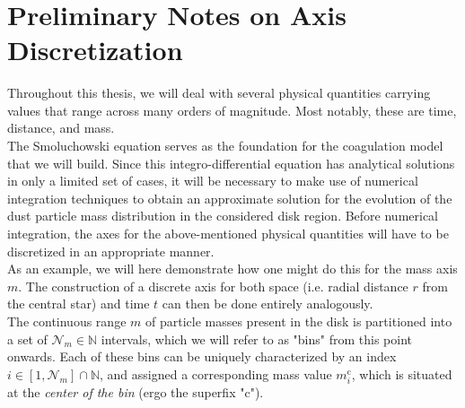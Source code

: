      \\
     \\
     \\
     \\
     \\


\clearpage\section{Preliminary Notes on Axis Discretization}
\label{sec:preliminary_notes_on_axis_discretization}

    Throughout this thesis, we will deal with several physical quantities carrying values that 
    range across many orders of magnitude. Most notably, these are time, distance, and mass. \\

    The Smoluchowski equation serves as the foundation for the coagulation model that we will 
    build. Since this integro-differential equation has analytical solutions in only a limited 
    set of cases, it will be necessary to make use of numerical integration techniques to obtain 
    an approximate solution for the evolution of the dust particle mass distribution in the 
    considered disk region. Before numerical integration, the axes for the above-mentioned 
    physical quantities will have to be discretized in an appropriate manner. \\

    As an example, we will here demonstrate how one might do this for the mass axis $m$. 
    The construction  of a discrete axis for both space (i.e. radial distance $r$ from the 
    central star) and time $t$ can then be done entirely analogously. \\

    The continuous range $m$ of particle masses present in the disk is partitioned into a set of 
    $\mathcal N_m\in\mathbb N$ intervals, which we will refer to as "bins" from this point onwards. 
    Each of these bins can be uniquely characterized by an index 
    $i\in[1,\mathcal N_m]\cap\mathbb N$, and assigned a corresponding mass value $m_i^\text{c}$, 
    which is situated at the \textit{center of the bin} (ergo the superfix "c").\\
    
